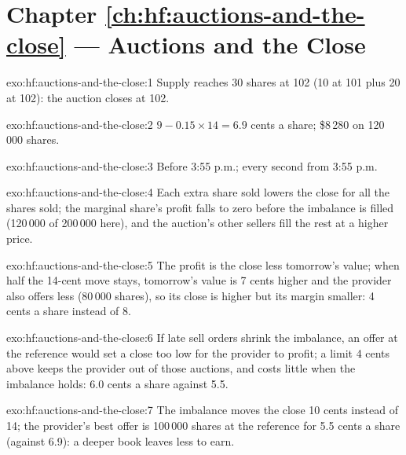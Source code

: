 \section*{Chapter \ref{ch:hf:auctions-and-the-close} --- Auctions and the Close}

\begin{solution}{exo:hf:auctions-and-the-close:1}
Supply reaches 30 shares at 102 (10 at 101 plus 20 at 102): the auction closes at 102.
\end{solution}

\begin{solution}{exo:hf:auctions-and-the-close:2}
$9-0.15\times14=6.9$ cents a share; \$8\,280 on 120\,000 shares.
\end{solution}

\begin{solution}{exo:hf:auctions-and-the-close:3}
Before 3:55 p.m.; every second from 3:55 p.m.
\end{solution}

\begin{solution}{exo:hf:auctions-and-the-close:4}
Each extra share sold lowers the close for all the shares sold; the marginal share's profit falls to zero before the imbalance is filled
(120\,000 of 200\,000 here), and the auction's other sellers fill the rest at a higher price.
\end{solution}

\begin{solution}{exo:hf:auctions-and-the-close:5}
The profit is the close less tomorrow's value; when half the 14-cent move stays, tomorrow's value is 7 cents higher and the provider also offers
less (80\,000 shares), so its close is higher but its margin smaller: 4 cents a share instead of 8.
\end{solution}

\begin{solution}{exo:hf:auctions-and-the-close:6}
If late sell orders shrink the imbalance, an offer at the reference would set a close too low for the provider to profit; a limit 4 cents above
keeps the provider out of those auctions, and costs little when the imbalance holds: 6.0 cents a share against 5.5.
\end{solution}

\begin{solution}{exo:hf:auctions-and-the-close:7}
The imbalance moves the close 10 cents instead of 14; the provider's best offer is 100\,000 shares at the reference for 5.5 cents a share
(against 6.9): a deeper book leaves less to earn.
\end{solution}


